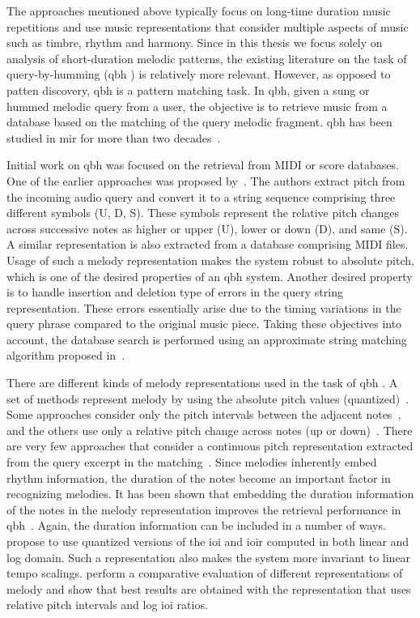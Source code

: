 The approaches mentioned above typically focus on long-time duration music repetitions  and use music representations that consider multiple aspects of music such as timbre, rhythm and harmony. Since in this thesis we focus solely on analysis of short-duration melodic patterns, the existing literature on the task of query-by-humming (\gls{qbh} ) is relatively more relevant. However, as opposed to patten discovery, \gls{qbh}  is a pattern matching task. In \gls{qbh}, given a sung or hummed melodic query from a user, the objective is to retrieve music from a database based on the matching of the query melodic fragment. \gls{qbh}  has been studied in \gls{mir} for more than two decades~\cite{ghias1995query,McNab1996}.

Initial work on \gls{qbh}  was focused on the retrieval from MIDI or score databases. One of the earlier approaches was proposed by~\cite{ghias1995query}. The authors extract pitch from the incoming audio query and convert it to a string sequence comprising three different symbols (U, D, S). These symbols represent the relative pitch changes across successive notes as higher or upper (U), lower or down (D), and same (S). A similar representation is also extracted from a database comprising MIDI files. Usage of such a melody representation makes the system robust to absolute pitch, which is one of the desired properties of an \gls{qbh} system. Another desired property is to handle insertion and deletion type of errors in the query string representation. These errors essentially arise due to the timing variations in the query phrase compared to the original music piece. Taking these objectives into account, the database search is performed using an approximate string matching algorithm proposed in~\cite{baeza1992fast}.

There are different kinds of melody representations used in the task of \gls{qbh} . A set of methods represent melody by using the absolute pitch values (quantized)~\citep{McNab1996,uitdenbogerd1998manipulation}. Some approaches consider only the pitch intervals between the adjacent notes~\citep{pauws2004cubyhum}, and the others use only a relative pitch change across notes (up or down)~\citep{ghias1995query}. There are very few approaches that consider a continuous pitch representation extracted from the query excerpt in the matching~\citep{mazzoni2001melody}. Since melodies inherently embed rhythm information, the duration of the notes become an important factor in recognizing melodies. It has been shown that embedding the duration information of the notes in the melody representation improves the retrieval performance in \gls{qbh}~\citep{pardo2002encoding}. Again, the duration information can be included in a number of ways. \cite{pardo2002encoding} propose to use quantized versions of the \gls{ioi} and \gls{ioir} computed in both linear and log domain. Such a representation also makes the system more invariant to linear tempo scalings. \cite{dannenberg2007comparative} perform a comparative evaluation of different representations of melody and show that best results are obtained with the representation that uses relative pitch intervals and log \gls{ioi} ratios. 

